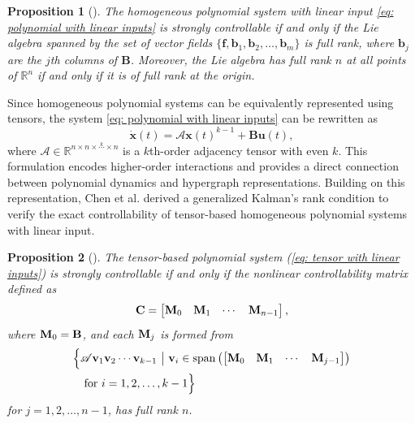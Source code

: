 \documentclass[journal,twoside,web]{ieeecolor}
\newtheorem{proposition}{Proposition}
\begin{document}
\begin{proposition}[\cite{jurdjevic1997geometric}]\label{thm: jurdjevic and kupka}
   The homogeneous polynomial  system with linear input \eqref{eq: polynomial with linear inputs} is strongly controllable if and only if the Lie algebra spanned by the set of vector fields $\{\textbf{f},\textbf{b}_{1},\textbf{b}_{2},\dots,\textbf{b}_{m}\}$ is full rank, where $\textbf{b}_{j}$ are the $j$th columns of  $\textbf{B}$.
    Moreover, the Lie algebra has full rank $n$ at all points of $\mathbb{R}^n$ if and only if it is of full rank at the origin.
\end{proposition}



Since homogeneous polynomial systems can be equivalently represented using tensors, the system  \eqref{eq: polynomial with linear inputs} can be rewritten  as
\begin{equation}\label{eq: tensor with linear inputs}
    \dot{\textbf{x}}(t)=\mathscr{A}\textbf{x}(t)^{k-1}+\textbf{B}\textbf{u}(t),
\end{equation}
where $\mathscr A\in\mathbb{R}^{n\times n\times\stackrel{k}{\cdots}\times n}$ is a $k$th-order adjacency tensor with even $k$.
%
This formulation encodes higher-order interactions and provides a direct connection between polynomial dynamics and hypergraph representations.
%
Building on this representation, Chen et al. \cite{chen2021controllability} derived a generalized Kalman's rank condition to verify the exact controllability of tensor-based homogeneous polynomial systems with linear input.



\begin{proposition}[\cite{chen2021controllability}]\label{thm: cohg}
The tensor-based polynomial system (\ref{eq: tensor with linear inputs}) is strongly controllable if and only if the nonlinear controllability matrix  defined as
\begin{align*}
\textbf C=\begin{bmatrix}\textbf M_0 & \textbf M_1 &\cdots& \textbf M_{n-1}\end{bmatrix},
\end{align*}
where $\textbf M_0=\textbf B$, and 
each $\textbf M_j$  is formed from 
\begin{equation*}
\begin{split}
    \Big\{&\mathscr A\textbf v_1\textbf{v}_2\cdots\textbf v_{k-1}\text{ }\big|\text{ }\textbf v_{i}\in\mathrm{span}\left(\begin{bmatrix}\textbf M_0 & \textbf M_1 &\cdots& \textbf M_{j-1}\end{bmatrix}\right) \\ &\text{ for } i=1,2,\dots,k-1\Big\}
    \end{split}
\end{equation*}
for $j=1,2,\dots,n-1$, has full rank $n$.
\end{proposition}
\end{document}
